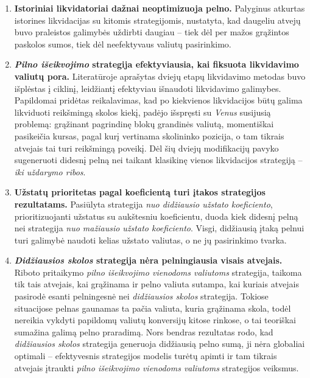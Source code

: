 \documentclass[]{VUMIFTemplateClass}
\begin{document}
\begin{enumerate}
  \item \textbf{Istoriniai likvidatoriai dažnai neoptimizuoja pelno.} Palyginus atkurtas istorines likvidacijas su kitomis strategijomis, nustatyta, kad daugeliu atvejų buvo praleistos galimybės uždirbti daugiau – tiek dėl per mažos grąžintos paskolos sumos, tiek dėl neefektyvaus valiutų pasirinkimo.

  \item \textbf{\textit{Pilno išeikvojimo} strategija efektyviausia, kai fiksuota likvidavimo valiutų pora.} Literatūroje aprašytas dviejų etapų likvidavimo metodas buvo išplėstas į ciklinį, leidžiantį efektyviau išnaudoti likvidavimo galimybes. Papildomai pridėtas reikalavimas, kad po kiekvienos likvidacijos būtų galima likviduoti reikšmingą skolos kiekį, padėjo išspręsti su \textit{Venus} susijusią problemą: grąžinant pagrindinę blokų grandinės valiutą, momentiškai pasikeičia kursas, pagal kurį vertinama skolininko pozicija, o tam tikrais atvejais tai turi reikšmingą poveikį. Dėl šių dviejų modifikacijų pavyko sugeneruoti didesnį pelną nei taikant klasikinę vienos likvidacijos strategiją – \textit{iki uždarymo ribos}.

  \item \textbf{Užstatų prioritetas pagal koeficientą turi įtakos strategijos rezultatams.} Pasiūlyta strategija \textit{nuo didžiausio užstato koeficiento}, prioritizuojanti užstatus su aukštesniu koeficientu, duoda kiek didesnį pelną nei strategija \textit{nuo mažiausio užstato koeficiento}. Visgi, didžiausią įtaką pelnui turi galimybė naudoti kelias užstato valiutas, o ne jų pasirinkimo tvarka.

  \item \textbf{\textit{Didžiausios skolos} strategija nėra pelningiausia visais atvejais.} Riboto pritaikymo \textit{pilno išeikvojimo vienodoms valiutoms} strategija, taikoma tik tais atvejais, kai grąžinama ir pelno valiuta sutampa, kai kuriais atvejais pasirodė esanti pelningesnė nei \textit{didžiausios skolos} strategija. Tokiose situacijose pelnas gaunamas ta pačia valiuta, kuria grąžinama skola, todėl nereikia vykdyti papildomų valiutų konversijų kitose rinkose, o tai teoriškai sumažina galimą pelno praradimą. Nors bendras rezultatas rodo, kad \textit{didžiausios skolos} strategija generuoja didžiausią pelno sumą, ji nėra globaliai optimali – efektyvesnis strategijos modelis turėtų apimti ir tam tikrais atvejais įtraukti \textit{pilno išeikvojimo vienodoms valiutoms} strategijos veiksmus.


\end{enumerate}
\end{document}
